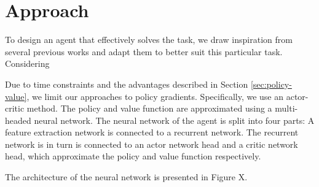 \section{Approach}
\label{sec:approach}



To design an agent that effectively solves the task, we draw inspiration from several previous works and adapt them to better suit this particular task.
Considering 

Due to time constraints and the advantages described in Section \ref{sec:policy-value}, we limit our approaches to policy gradients.
Specifically, we use an actor-critic method.
The policy and value function are approximated using a multi-headed neural network.
The neural network of the agent is split into four parts:
A feature extraction network is connected to a recurrent network.
The recurrent network is in turn is connected to an actor network head and a critic network head, which approximate the policy and value function respectively.

The architecture of the neural network is presented in Figure X.











